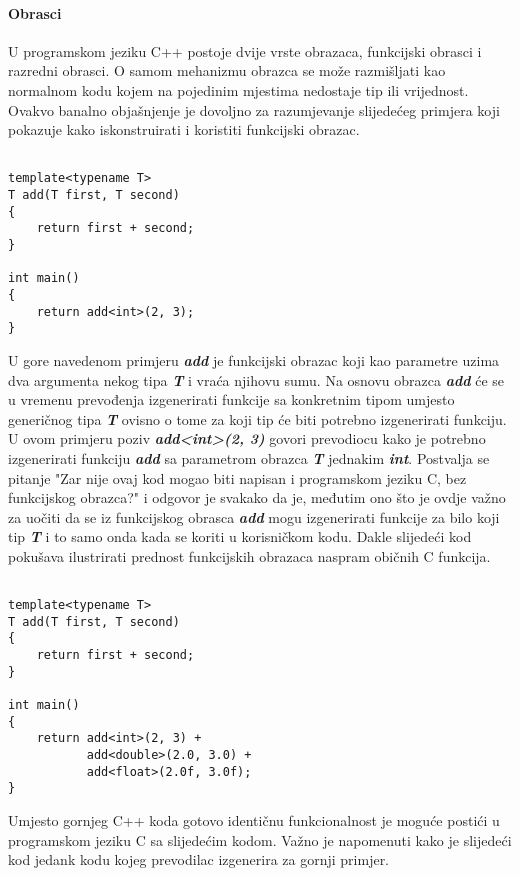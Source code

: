 \paragraph{Obrasci}\label{subsection:templates}
U programskom jeziku C++ postoje dvije vrste obrazaca, funkcijski obrasci i razredni obrasci. O samom mehanizmu obrazca se može razmišljati kao normalnom kodu kojem na pojedinim mjestima nedostaje tip ili vrijednost. Ovakvo banalno objašnjenje je dovoljno za razumjevanje slijedećeg primjera koji pokazuje kako iskonstruirati i koristiti funkcijski obrazac.  
\lstset{language=C++, tabsize=2, frame=single, breaklines=true}
\begin{lstlisting}

template<typename T>
T add(T first, T second)
{
    return first + second;
}

int main()
{
    return add<int>(2, 3);
}
\end{lstlisting}
U gore navedenom primjeru \textbf{\textit{add}} je funkcijski obrazac koji kao parametre uzima dva argumenta nekog tipa \textbf{\textit{T}} i vraća njihovu sumu. Na osnovu obrazca \textbf{\textit{add}} će se u vremenu prevođenja izgenerirati funkcije sa konkretnim tipom umjesto generičnog tipa \textbf{\textit{T}} ovisno o tome za koji tip će biti potrebno izgenerirati funkciju. U ovom primjeru poziv \textbf{\textit{add<int>(2, 3)}} govori prevodiocu kako je potrebno izgenerirati funkciju \textbf{\textit{add}} sa parametrom obrazca \textbf{\textit{T}} jednakim \textbf{\textit{int}}. Postvalja se pitanje "Zar nije ovaj kod mogao biti napisan i programskom jeziku C, bez funkcijskog obrazca?" i odgovor je svakako da je, međutim ono što je ovdje važno za uočiti da se iz funkcijskog obrasca \textbf{\textit{add}} mogu izgenerirati funkcije za bilo koji tip \textbf{\textit{T}} i to samo onda kada se koriti u korisničkom kodu. Dakle slijedeći kod pokušava ilustrirati prednost funkcijskih obrazaca naspram običnih C funkcija.
\lstset{language=C++, tabsize=2, frame=single, breaklines=true}
\begin{lstlisting}

template<typename T>
T add(T first, T second)
{
    return first + second;
}

int main()
{
    return add<int>(2, 3) + 
           add<double>(2.0, 3.0) + 
           add<float>(2.0f, 3.0f);
}
\end{lstlisting}
Umjesto gornjeg C++ koda gotovo identičnu funkcionalnost je moguće postići u programskom jeziku C sa slijedećim kodom. Važno je napomenuti kako je slijedeći kod jedank kodu kojeg prevodilac izgenerira za gornji primjer.
